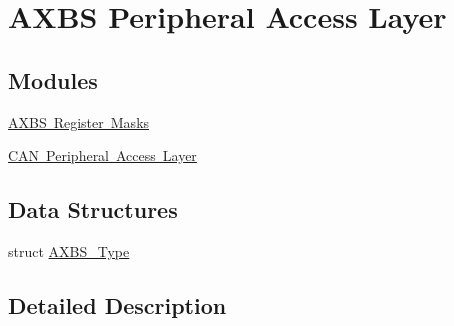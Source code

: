 \hypertarget{group___a_x_b_s___peripheral___access___layer}{}\section{A\+X\+BS Peripheral Access Layer}
\label{group___a_x_b_s___peripheral___access___layer}
\subsection*{Modules}
\begin{DoxyCompactItemize}
\item 
\mbox{\hyperlink{group___a_x_b_s___register___masks}{A\+X\+B\+S Register Masks}}
\item 
\mbox{\hyperlink{group___c_a_n___peripheral___access___layer}{C\+A\+N Peripheral Access Layer}}
\end{DoxyCompactItemize}
\subsection*{Data Structures}
\begin{DoxyCompactItemize}
\item 
struct \mbox{\hyperlink{struct_a_x_b_s___type}{A\+X\+B\+S\+\_\+\+Type}}
\end{DoxyCompactItemize}


\subsection{Detailed Description}
